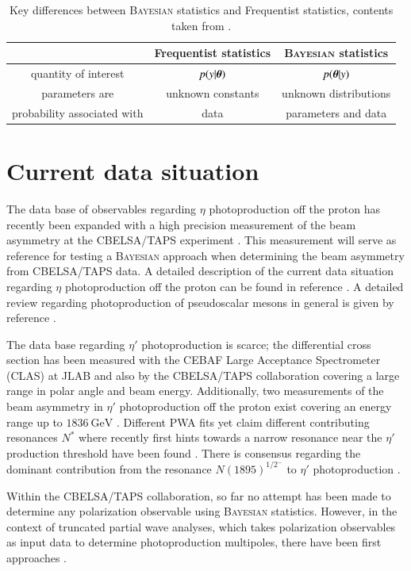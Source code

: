 \begin{table}[htbp]
	\centering
	\begin{tabular}{c|cc}
		\toprule
		&\textbf{Frequentist statistics} &\textbf{\textsc{Bayesian} statistics}\\
		\hline
		quantity of interest & $p(y|\boldsymbol{\theta})$ & $p(\boldsymbol{\theta}|y)$\\
		parameters are & unknown constants& unknown distributions\\
		probability associated with & data & parameters and data \\
		\bottomrule
	\end{tabular}
\caption{Key differences between \textsc{Bayesian} statistics and Frequentist statistics, contents taken from \cite{bayes1}.}
\label{tab:sum}
\end{table}
\section{Current data situation}
The data base of observables regarding $\eta$ photoproduction off the proton has recently been expanded with a high precision measurement of the beam asymmetry at the CBELSA/TAPS experiment \cite{farahphd,eta}. This measurement will serve as reference for testing a \textsc{Bayesian} approach when determining the beam asymmetry from CBELSA/TAPS data. A detailed description of the current data situation regarding $\eta$ photoproduction off the proton can be found in reference \cite{farahphd}. A detailed review regarding photoproduction of pseudoscalar mesons in general is given by reference \cite{Thiel_2022}.

The data base regarding $\eta'$ photoproduction is scarce; the differential cross section has been measured with the CEBAF Large Acceptance Spectrometer (CLAS) at JLAB \cite{etap_cs1} and also by the CBELSA/TAPS collaboration \cite{etap_cs} covering a large range in polar angle and beam energy. Additionally, two measurements of the beam asymmetry in $\eta'$ photoproduction off the proton exist covering an energy range up to $\SI{1836}{\giga\eV}$ \cite{thresh,collins}. Different PWA fits yet claim different contributing resonances $N^*$ where recently first hints towards a narrow resonance near the $\eta'$ production threshold have been found \cite{etap_bnga,etaMAID}. There is consensus regarding the dominant contribution from the resonance $N(1895)^{1/2^-}$ to $\eta'$ photoproduction \cite{etap_bnga,etaMAID}.

Within the CBELSA/TAPS collaboration, so far no attempt has been made to determine any polarization observable using \textsc{Bayesian} statistics. However, in the context of truncated partial wave analyses, which takes polarization observables as input data to determine photoproduction multipoles, there have been first approaches \cite{jean_msc,philipp_phd}.
